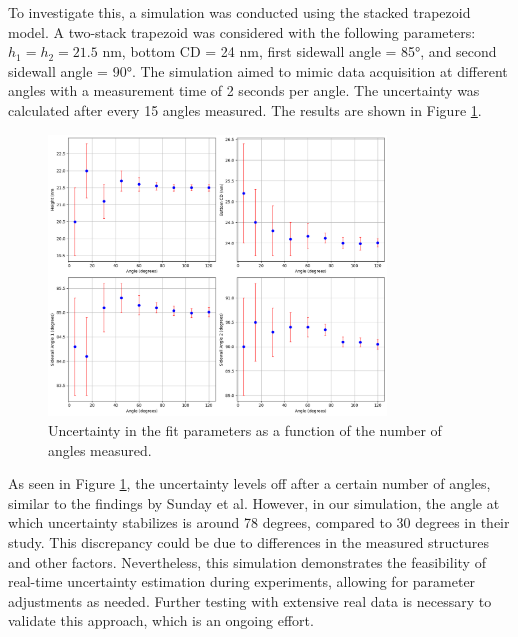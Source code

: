   To investigate this, a simulation was conducted using the stacked trapezoid model. A two-stack 
  trapezoid was considered with the following parameters: \( h_{1} = h_{2} = 21.5 \) nm, bottom CD = 24 nm, 
  first sidewall angle = 85°, and second sidewall angle = 90°. The simulation aimed to mimic 
  data acquisition at different angles with a measurement time of 2 seconds per angle. The uncertainty 
  was calculated after every 15 angles measured. The results are shown in Figure \ref{fig:uncertainity}.

  \begin{figure}[h]
  \centering
  \includegraphics[width=0.8\textwidth]{images/uncertainity.png}
  \caption{Uncertainty in the fit parameters as a function of the number of angles measured.}
  \label{fig:uncertainity}
  \end{figure}
  
  As seen in Figure \ref{fig:uncertainity}, the uncertainty levels off after a certain number of angles, similar to the findings by Sunday et al.
   However, in our simulation, the angle at which uncertainty stabilizes is around 78 degrees, 
   compared to 30 degrees in their study. This discrepancy could be due to differences in the measured
structures and other factors. Nevertheless, this simulation demonstrates the feasibility of real-time 
uncertainty estimation during experiments, allowing for parameter adjustments as needed. Further 
testing with extensive real data is necessary to validate this approach, which is an ongoing effort.
